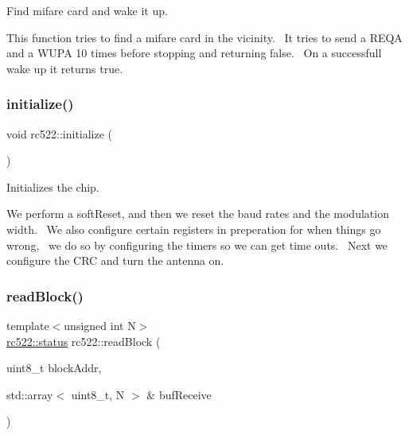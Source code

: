 Find mifare card and wake it up. 

This function tries to find a mifare card in the vicinity.~\newline
It tries to send a R\+E\+QA and a W\+U\+PA 10 times before stopping and returning false.~\newline
On a successfull wake up it returns true. \mbox{\label{classrc522_a49a6b70c2d43ae0d22c608025ac55dec}} 
\subsubsection{\texorpdfstring{initialize()}{initialize()}}
{\footnotesize\ttfamily void rc522\+::initialize (\begin{DoxyParamCaption}{ }\end{DoxyParamCaption})}



Initializes the chip. 

We perform a soft\+Reset, and then we reset the baud rates and the modulation width.~\newline
We also configure certain registers in preperation for when things go wrong,~\newline
we do so by configuring the timers so we can get time outs.~\newline
Next we configure the C\+RC and turn the antenna on. \mbox{\label{classrc522_a87dfbf9cf9707a675c91981c92c93fdc}} 
\subsubsection{\texorpdfstring{read\+Block()}{readBlock()}}
{\footnotesize\ttfamily template$<$unsigned int N$>$ \\
\hyperlink{classspiReader_a4bcf984823c38cf4841ebf619e788790}{rc522\+::status} rc522\+::read\+Block (\begin{DoxyParamCaption}\item[{uint8\+\_\+t}]{block\+Addr,  }\item[{std\+::array$<$ uint8\+\_\+t, N $>$ \&}]{buf\+Receive }\end{DoxyParamCaption})\hspace{0.3cm}{\ttfamily [inline]}}



